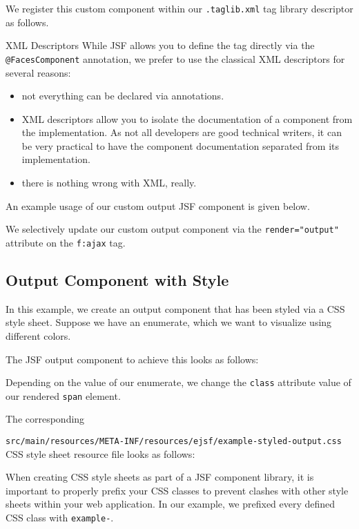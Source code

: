 We register this custom component within our \texttt{.taglib.xml} tag library descriptor as follows.


\begin{TIP}{XML Descriptors}
While JSF allows you to define the tag directly via the \texttt{@FacesComponent} annotation,
we prefer to use the classical XML descriptors for several reasons:
\begin{itemize}
	\item not everything can be declared via annotations.
	\item XML descriptors allow you to isolate the documentation of a component from the implementation.
	As not all developers are good technical writers, it can be very practical to have the component documentation separated from its implementation.
	\item there is nothing wrong with XML, really.
\end{itemize}
\end{TIP}

An example usage of our custom output JSF component is given below.

We selectively update our custom output component via the \texttt{render="output"} attribute on the \texttt{f:ajax} tag.

\subsection{Output Component with Style}

In this example, we create an output component that has been styled via a CSS style sheet.
Suppose we have an enumerate, which we want to visualize using different colors.


The JSF output component to achieve this looks as follows:

Depending on the value of our enumerate, we change the \texttt{class} attribute value of our rendered \texttt{span} element.

The corresponding

\texttt{src/main/resources/META-INF/resources/ejsf/example-styled-output.css} CSS style sheet resource file looks as follows:

When creating CSS style sheets as part of a JSF component library, it is important to properly prefix your CSS classes to prevent clashes with other style sheets within your web application.
In our example, we prefixed every defined CSS class with \texttt{example-}.

